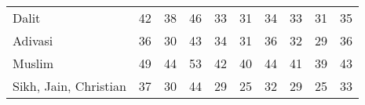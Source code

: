 \begin{tabular}{l*{9}{c}}
Dalit               &          42&          38&          46&          33&          31&          34&          33&          31&          35\\
Adivasi             &          36&          30&          43&          34&          31&          36&          32&          29&          36\\
Muslim              &          49&          44&          53&          42&          40&          44&          41&          39&          43\\
Sikh, Jain, Christian&          37&          30&          44&          29&          25&          32&          29&          25&          33\\
\bottomrule
\end{tabular}
